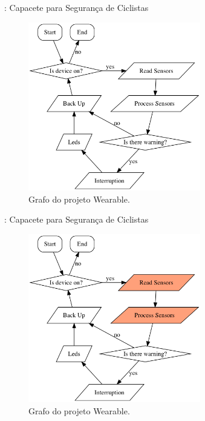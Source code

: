    \begin{frame}{\Wearable: Capacete para Segurança de Ciclistas}
        \vspace{-0.8em}
      
      \begin{figure}[h] \centering
         \includegraphics[width=0.67\textwidth]{img/capacete.png}
         \vspace{-1em}
         \caption{Grafo do projeto Wearable.}
      \end{figure}
      
   \end{frame}

    \begin{frame}{\Wearable: Capacete para Segurança de Ciclistas}
    \vspace{-0.8em}
    
        \begin{figure}[h] \centering
        \includegraphics[width=0.67\textwidth]{img/capacete2.png}
        \vspace{-1em}
        \caption{Grafo do projeto Wearable.}
        \end{figure}
    \end{frame}


